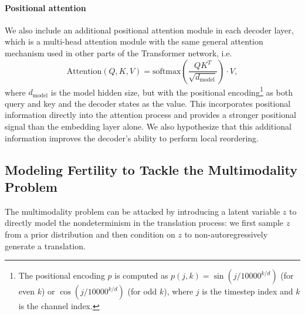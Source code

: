 \documentclass{article} \usepackage{iclr2018_conference,times}
\begin{document}
\vspace{-5pt}
\paragraph{Positional attention}
We also include an additional positional attention module in each decoder layer, which is a multi-head attention module with the same general attention mechanism used in other parts of the Transformer network, i.e.
\begin{equation}
\text{Attention}(Q,K,V)=\text{softmax}\left(\frac{QK^T}{\sqrt{d_\text{model}}}\right)\cdot V,
\label{eq.attention}
\end{equation}
where $d_\text{model}$ is the model hidden size, but with the positional encoding\footnote{The positional encoding $p$ is computed as $p(j, k) =
\sin{(j/10000^{k/d})}$ (for even $k$) or $\cos{(j/10000^{k/d})}$ (for odd $k$), where $j$ is the timestep index and $k$ is the channel index.} as both query and key and the decoder states as the value. This incorporates positional information directly into the attention process and provides a stronger positional signal than the embedding layer alone. We also hypothesize that this additional information improves the decoder's ability to perform local reordering.

\subsection{Modeling Fertility to Tackle the Multimodality Problem}
\label{sec.fertility}

The multimodality problem can be attacked by introducing a latent variable $z$ to directly model the nondeterminism in the translation process: we first sample $z$ from a prior distribution and then condition on $z$ to non-autoregressively generate a translation.
\end{document}

